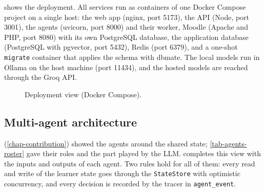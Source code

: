  shows the deployment. All services run as
containers of one Docker Compose project on a single host: the web app
(nginx, port 5173), the API (Node, port 3001), the agents (uvicorn, port
8000) and their worker, Moodle (Apache and PHP, port 8080) with its own
PostgreSQL database, the application database (PostgreSQL with pgvector,
port 5432), Redis (port 6379), and a one-shot \texttt{migrate} container
that applies the schema with dbmate. The local models run in Ollama on
the host machine (port 11434), and the hosted models are reached through
the Groq API.

\begin{figure}[htbp]
  \centering
  \caption{Deployment view (Docker Compose).}
  \label{fig-deployment}
\end{figure}

\subsection{Multi-agent architecture}

 (\cref{chap-contribution}) showed the agents
around the shared state; \cref{tab-agents-roster} gave their roles and
the part played by the LLM.  completes this view
with the inputs and outputs of each agent. Two rules hold for all of
them: every read and write of the learner state goes through the
\texttt{StateStore} with optimistic concurrency, and every decision is
recorded by the tracer in \texttt{agent\_event}.

